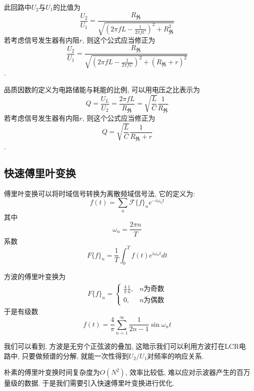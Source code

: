 \documentclass[12pt]{article}
\numberwithin{equation}{section}
\numberwithin{figure}{section}
\begin{document}
此回路中$U_2$与$U_1$的比值为
\begin{equation}
  \frac{U_2}{U_1} = \frac{R_{外}}{\sqrt{(2\pi fL-\frac1{2\pi fC})^2+R_{外}^2}}
\end{equation}
若考虑信号发生器有内阻$r$, 则这个公式应当修正为
\begin{equation}
  \frac{U_2}{U_1} = \frac{R_{外}}{\sqrt{(2\pi fL-\frac1{2\pi fC})^2+(R_{外}+r)^2}}
\end{equation}
.

品质因数的定义为电路储能与耗能的比例, 可以用电压之比表示为
\begin{equation}
  Q=\frac{U_L}{U_2}=\frac{2\pi fL}{R_{外}}=\sqrt{\frac L C}\frac{1}{R_{外}}
\end{equation}
若考虑信号发生器有内阻$r$, 则这个公式应当修正为
\begin{equation}
  Q=\sqrt{\frac L C}\frac{1}{R_{外}+r}
\end{equation}
.

\subsection{快速傅里叶变换}
傅里叶变换可以将时域信号转换为离散频域信号法, 它的定义为\cite{ft}:
\begin{equation}
  f(t)=\sum_n \mathcal F\{f\}_n e^{-i\omega_n t}
\end{equation}
其中
\begin{equation}
  \omega_n=\frac{2\pi n}{T}
\end{equation}
系数
\begin{equation}
  F\{f\}_n = \frac{1}{T}\int_0^T f(t)e^{i\omega_n t}dt
\end{equation}

方波的傅里叶变换为
\begin{align}
  F\{f\}_n=\begin{cases}
    \frac 4{\pi}\frac1{n}, & n\text{为奇数}\\
    0, & n\text{为偶数}
  \end{cases}
\end{align}
于是有级数
\begin{equation}
  f(t)=\frac 4{\pi}\sum_{n=1}^\infty \frac1{2n-1}\sin\omega_n t
\end{equation}

我们可以看到, 方波是无穷个正弦波的叠加, 这暗示我们可以利用方波打在LCR电路中, 只要做频谱的分解, 就能一次性得到$U_2/U_1$对频率的响应关系.

朴素的傅里叶变换时间复杂度为$O(N^2)$, 效率比较低, 难以应对示波器产生的百万量级的数据. 于是我们需要引入快速傅里叶变换进行优化.
\end{document}
